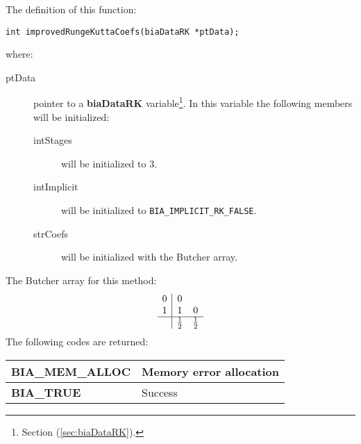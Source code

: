 The definition of this function:
%
\begin{verbatim}
int improvedRungeKuttaCoefs(biaDataRK *ptData);
\end{verbatim} 
%
where:
%
\begin{description}
\item[ptData] pointer to a \textbf{biaDataRK} variable\footnote{Section (\ref{sec:biaDataRK}).}. In this variable the following members will be initialized:
%
\begin{description}
%    
\item[intStages] will be initialized to $3$.
%  
\item[intImplicit] will be initialized to \texttt{BIA\_IMPLICIT\_RK\_FALSE}.
%
\item[strCoefs] will be initialized with the Butcher array.
%  
\end{description}
%  
\end{description}
%
The Butcher array for this method:
%
\begin{displaymath}
\begin{array}{c|cc}
0 & 0 \\
1 & 1 & 0 \\
\hline
 & \frac{1}{2} & \frac{1}{2}
\end{array}
\end{displaymath}
%
The following codes are returned:
%
\begin{center}
\begin{tabular}{|l|l|}
\hline
\textbf{BIA\_MEM\_ALLOC} & Memory error allocation \\
\hline
\textbf{BIA\_TRUE} & Success \\
\hline
\end{tabular}
\end{center}
